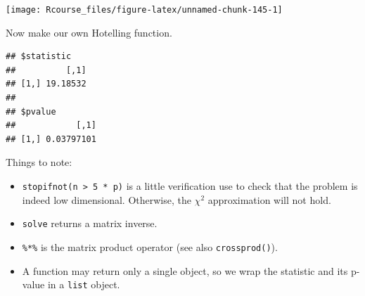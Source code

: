 \documentclass[]{book}
\newenvironment{Shaded}{\begin{snugshade}}{\end{snugshade}}
\newcommand{\KeywordTok}[1]{\textcolor[rgb]{0.13,0.29,0.53}{\textbf{{#1}}}}
\newcommand{\DataTypeTok}[1]{\textcolor[rgb]{0.13,0.29,0.53}{{#1}}}
\newcommand{\DecValTok}[1]{\textcolor[rgb]{0.00,0.00,0.81}{{#1}}}
\newcommand{\StringTok}[1]{\textcolor[rgb]{0.31,0.60,0.02}{{#1}}}
\newcommand{\OtherTok}[1]{\textcolor[rgb]{0.56,0.35,0.01}{{#1}}}
\newcommand{\NormalTok}[1]{{#1}}
\providecommand{\tightlist}{%
  \setlength{\itemsep}{0pt}\setlength{\parskip}{0pt}}
\theoremstyle{definition}
\theoremstyle{definition}
\theoremstyle{remark}
\begin{document}
\texttt{[image: Rcourse\_files/figure-latex/unnamed-chunk-145-1]}

Now make our own Hotelling function.

\begin{Shaded}
\end{Shaded}

\begin{verbatim}
## $statistic
##          [,1]
## [1,] 19.18532
## 
## $pvalue
##            [,1]
## [1,] 0.03797101
\end{verbatim}

Things to note:

\begin{itemize}
\tightlist
\item
  \texttt{stopifnot(n\ \textgreater{}\ 5\ *\ p)} is a little
  verification use to check that the problem is indeed low dimensional.
  Otherwise, the \(\chi^2\) approximation will not hold.
\item
  \texttt{solve} returns a matrix inverse.
\item
  \texttt{\%*\%} is the matrix product operator (see also
  \texttt{crossprod()}).
\item
  A function may return only a single object, so we wrap the statistic
  and its p-value in a \texttt{list} object.
\end{itemize}
\end{document}
